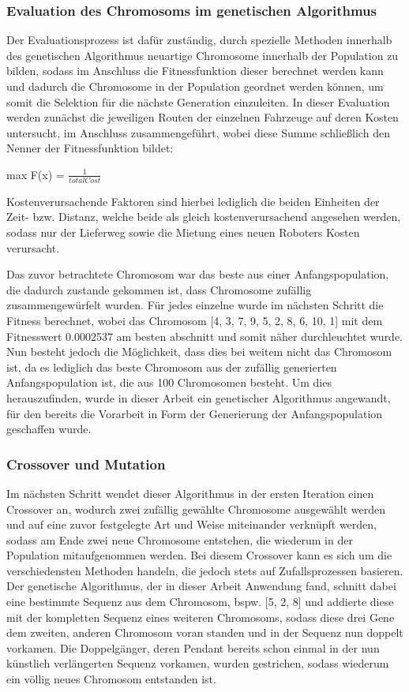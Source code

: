 \documentclass[a4paper,12pt,parskip,bibtotoc,liststotoc]{article}
\begin{document}
\subsubsection{Evaluation des Chromosoms im genetischen Algorithmus}

Der Evaluationsprozess ist dafür zuständig, durch spezielle Methoden innerhalb des genetischen Algorithmus neuartige Chromosome innerhalb der Population zu bilden, sodass im Anschluss die Fitnessfunktion dieser berechnet werden kann und dadurch die Chromosome in der Population geordnet werden können, um somit die Selektion für die nächste Generation einzuleiten.
In dieser Evaluation werden zunächst die jeweiligen Routen der einzelnen Fahrzeuge auf deren Kosten untersucht, im Anschluss zusammengeführt, wobei diese Summe schließlich den Nenner der Fitnessfunktion bildet:

\begin{center}
max F(x) = $\frac{1}{totalCost}$
\end{center}

Kostenverursachende Faktoren sind hierbei lediglich die beiden Einheiten der Zeit- bzw. Distanz, welche beide als gleich kostenverursachend angesehen werden, sodass nur der Lieferweg sowie die Mietung eines neuen Roboters Kosten verursacht.

Das zuvor betrachtete Chromosom war das beste aus einer Anfangspopulation, die dadurch zustande gekommen ist, dass Chromosome zufällig zusammengewürfelt wurden.
Für jedes einzelne wurde im nächsten Schritt die Fitness berechnet, wobei das Chromosom [4, 3, 7, 9, 5, 2, 8, 6, 10, 1] mit dem Fitnesswert 0.0002537 am besten abschnitt und somit näher durchleuchtet wurde.
Nun besteht jedoch die Möglichkeit, dass dies bei weitem nicht das Chromosom ist, da es lediglich das beste Chromosom aus der zufällig generierten Anfangspopulation ist, die aus 100 Chromosomen besteht.
Um dies herauszufinden, wurde in dieser Arbeit ein genetischer Algorithmus angewandt, für den bereits die Vorarbeit in Form der Generierung der Anfangspopulation geschaffen wurde.

\subsubsection{Crossover und Mutation}

Im nächsten Schritt wendet dieser Algorithmus in der ersten Iteration einen Crossover an, wodurch zwei zufällig gewählte Chromosome ausgewählt werden und auf eine zuvor festgelegte Art und Weise miteinander verknüpft werden, sodass am Ende zwei neue Chromosome entstehen, die wiederum in der Population mitaufgenommen werden.
Bei diesem Crossover kann es sich um die verschiedensten Methoden handeln, die jedoch stets auf Zufallsprozessen basieren.
Der genetische Algorithmus, der in dieser Arbeit Anwendung fand, schnitt dabei eine bestimmte Sequenz aus dem Chromosom, bspw. [5, 2, 8] und addierte diese mit der kompletten Sequenz eines weiteren Chromosoms, sodass diese drei Gene dem zweiten, anderen Chromosom voran standen und in der Sequenz nun doppelt vorkamen. 
Die Doppelgänger, deren Pendant bereits schon einmal in der nun künstlich verlängerten Sequenz vorkamen, wurden gestrichen, sodass wiederum ein völlig neues Chromosom entstanden ist.
\end{document}
